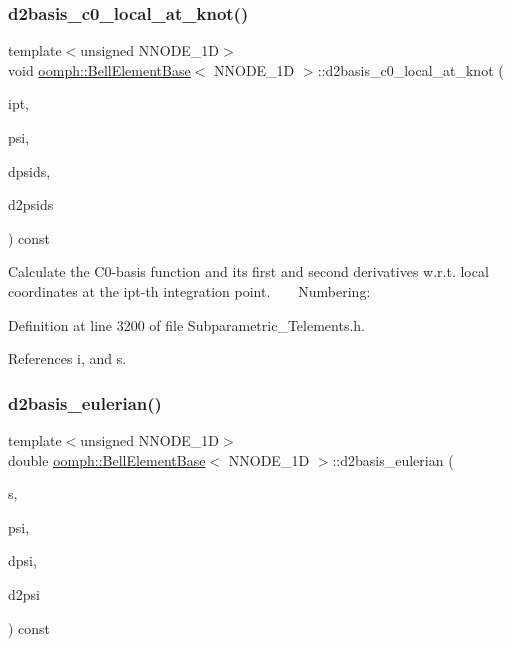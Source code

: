 \subsubsection{\texorpdfstring{d2basis\+\_\+c0\+\_\+local\+\_\+at\+\_\+knot()}{d2basis\_c0\_local\_at\_knot()}}
{\footnotesize\ttfamily template$<$unsigned N\+N\+O\+D\+E\+\_\+1D$>$ \\
void \hyperlink{classoomph_1_1BellElementBase}{oomph\+::\+Bell\+Element\+Base}$<$ N\+N\+O\+D\+E\+\_\+1D $>$\+::d2basis\+\_\+c0\+\_\+local\+\_\+at\+\_\+knot (\begin{DoxyParamCaption}\item[{const unsigned \&}]{ipt,  }\item[{\hyperlink{classoomph_1_1Shape}{Shape} \&}]{psi,  }\item[{\hyperlink{classoomph_1_1DShape}{D\+Shape} \&}]{dpsids,  }\item[{\hyperlink{classoomph_1_1DShape}{D\+Shape} \&}]{d2psids }\end{DoxyParamCaption}) const\hspace{0.3cm}{\ttfamily [inline]}}

Calculate the C0-\/basis function and its first and second derivatives w.\+r.\+t. local coordinates at the ipt-\/th integration point. ~\newline
~\newline
 Numbering\+: 

Definition at line 3200 of file Subparametric\+\_\+\+Telements.\+h.



References i, and s.

\mbox{\label{classoomph_1_1BellElementBase_af6a719134aecd142c6a9667607993171}} 
\subsubsection{\texorpdfstring{d2basis\+\_\+eulerian()}{d2basis\_eulerian()}}
{\footnotesize\ttfamily template$<$unsigned N\+N\+O\+D\+E\+\_\+1D$>$ \\
double \hyperlink{classoomph_1_1BellElementBase}{oomph\+::\+Bell\+Element\+Base}$<$ N\+N\+O\+D\+E\+\_\+1D $>$\+::d2basis\+\_\+eulerian (\begin{DoxyParamCaption}\item[{const \hyperlink{classoomph_1_1Vector}{Vector}$<$ double $>$ \&}]{s,  }\item[{\hyperlink{classoomph_1_1Shape}{Shape} \&}]{psi,  }\item[{\hyperlink{classoomph_1_1DShape}{D\+Shape} \&}]{dpsi,  }\item[{\hyperlink{classoomph_1_1DShape}{D\+Shape} \&}]{d2psi }\end{DoxyParamCaption}) const\hspace{0.3cm}{\ttfamily [inline]}}



